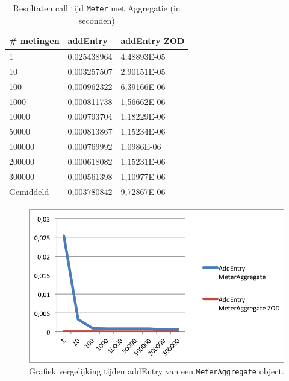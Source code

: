 \begin{table}[]
\centering
\begin{tabular}{|l|l|l|}
\hline
\# metingen & addEntry    & addEntry ZOD \\ \hline
1           & 0,025438964 & 4,48893E-05  \\ \hline
10          & 0,003257507 & 2,90151E-05  \\ \hline
100         & 0,000962322 & 6,39166E-06  \\ \hline
1000        & 0,000811738 & 1,56662E-06  \\ \hline
10000       & 0,000793704 & 1,18229E-06  \\ \hline
50000       & 0,000813867 & 1,15234E-06  \\ \hline
100000      & 0,000769992 & 1,0986E-06   \\ \hline
200000      & 0,000618082 & 1,15231E-06  \\ \hline
300000      & 0,000561398 & 1,10977E-06  \\ \hline
Gemiddeld   & 0,003780842 & 9,72867E-06  \\ \hline
\end{tabular}
\caption{Resultaten call tijd \texttt{Meter} met Aggregatie (in seconden)}
\label{Table:MeterAggregate}
\end{table}

\begin{figure}[!h]
  \centering
  \includegraphics[scale=1.0]{Afbeeldingen/Evaluatie/AddEntryMeterAggregate}
  \caption{Grafiek vergelijking tijden addEntry van een \texttt{MeterAggregate} object.}
  \label{fig:GraphMeterAggregate}
\end{figure}


